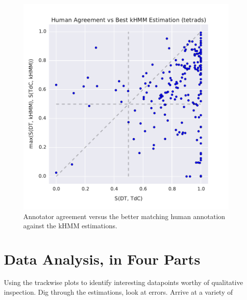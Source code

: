 \documentclass{article}
\begin{document}
\begin{figure}[t]
\centering
\includegraphics[width=\columnwidth]{human_agreement-vs-best_kHMM_est}
\caption{Annotator agreement versus the better matching human annotation against the kHMM estimations.}
\label{fig:annotator_agreement}
\end{figure}







\section{Data Analysis, in Four Parts}
\label{sec:data_analysis}

Using the trackwise plots to identify interesting datapoints worthy of qualitative inspection.
Dig through the estimations, look at errors.
Arrive at a variety of
\end{document}
